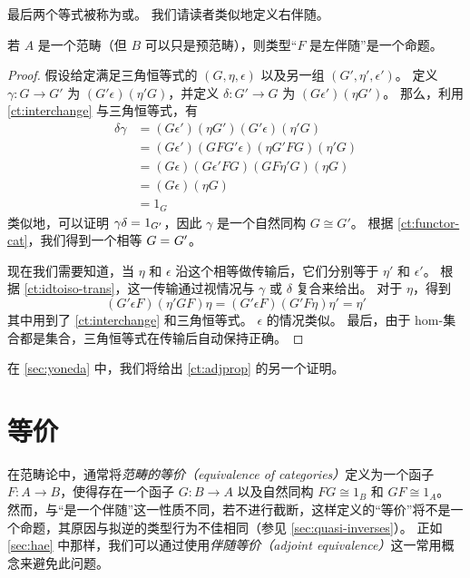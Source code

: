 最后两个等式被称为或。
我们请读者类似地定义右伴随。

\begin{lem}\label{ct:adjprop}
  若 $A$ 是一个范畴（但 $B$ 可以只是预范畴），则类型``$F$ 是左伴随''是一个命题。
\end{lem}

\begin{proof}
  假设给定满足三角恒等式的 $(G,\eta,\epsilon)$ 以及另一组 $(G',\eta',\epsilon')$。
  定义 $\gamma:G\to G'$ 为 $(G'\epsilon)(\eta' G)$，并定义 $\delta:G'\to G$ 为 $(G\epsilon')(\eta G')$。
  那么，利用 \cref{ct:interchange} 与三角恒等式，有
  \begin{align*}
    \delta\gamma &=
    (G\epsilon')(\eta G')(G'\epsilon)(\eta'G)\\
    &= (G\epsilon')(G F G'\epsilon)(\eta G' F G)(\eta'G)\\
    &= (G\epsilon)(G\epsilon'FG)(G F \eta' G)(\eta G)\\
    &= (G\epsilon)(\eta G)\\
    &= 1_G
  \end{align*}
  类似地，可以证明 $\gamma\delta =_{} 1_{G'}$，因此 $\gamma$ 是一个自然同构 $G\cong G'$。
  根据 \cref{ct:functor-cat}，我们得到一个相等 $G =_{} G'$。

  现在我们需要知道，当 $\eta$ 和 $\epsilon$ 沿这个相等做传输后，它们分别等于 $\eta'$ 和 $\epsilon'$。
  根据 \cref{ct:idtoiso-trans}，这一传输通过视情况与 $\gamma$ 或 $\delta$ 复合来给出。
  对于 $\eta$，得到
  \begin{equation*}
    (G'\epsilon F)(\eta'GF)\eta
    = (G'\epsilon F)(G'F\eta)\eta'
    = \eta'
  \end{equation*}
  其中用到了 \cref{ct:interchange} 和三角恒等式。
  $\epsilon$ 的情况类似。
  最后，由于 hom-集合都是集合，三角恒等式在传输后自动保持正确。
\end{proof}

在 \cref{sec:yoneda} 中，我们将给出 \cref{ct:adjprop} 的另一个证明。

\section{等价}
\label{sec:equivalences}

在范畴论中，通常将\emph{范畴的等价（equivalence of categories）}定义为一个函子 $F:A\to B$，使得存在一个函子 $G:B\to A$ 以及自然同构 $F G \cong 1_B$ 和 $G F \cong 1_A$。
然而，与``是一个伴随''这一性质不同，若不进行截断，这样定义的``等价''将不是一个命题，其原因与拟逆的类型行为不佳相同（参见 \cref{sec:quasi-inverses}）。
正如 \cref{sec:hae} 中那样，我们可以通过使用\emph{伴随等价（adjoint equivalence）}这一常用概念来避免此问题。

